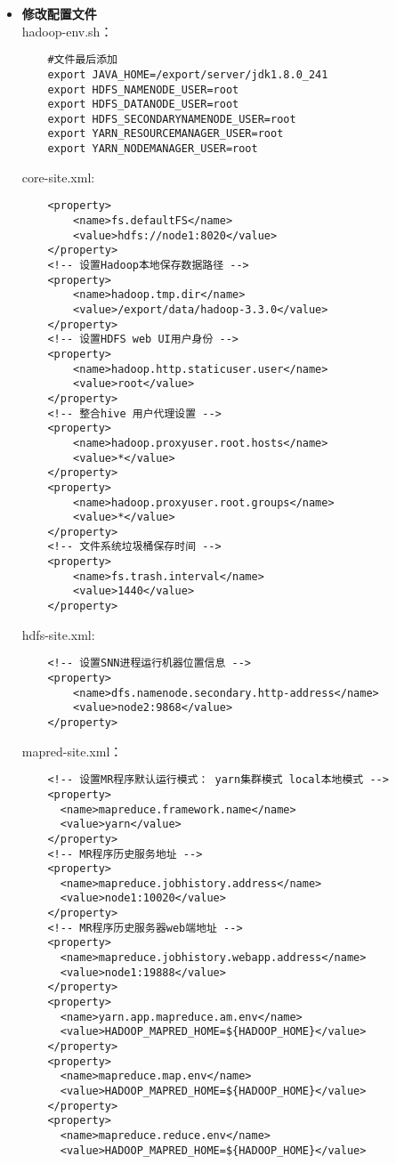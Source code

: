 \documentclass[bachelor]{thesis-uestc}
\begin{document}
\begin{itemize}
\item \textbf{修改配置文件}
\\
hadoop-env.sh：
\begin{verbatim}
    #文件最后添加
    export JAVA_HOME=/export/server/jdk1.8.0_241
    export HDFS_NAMENODE_USER=root
    export HDFS_DATANODE_USER=root
    export HDFS_SECONDARYNAMENODE_USER=root
    export YARN_RESOURCEMANAGER_USER=root
    export YARN_NODEMANAGER_USER=root 
\end{verbatim}
core-site.xml:
\begin{verbatim}
    <property>
        <name>fs.defaultFS</name>
        <value>hdfs://node1:8020</value>
    </property>
    <!-- 设置Hadoop本地保存数据路径 -->
    <property>
        <name>hadoop.tmp.dir</name>
        <value>/export/data/hadoop-3.3.0</value>
    </property>
    <!-- 设置HDFS web UI用户身份 -->
    <property>
        <name>hadoop.http.staticuser.user</name>
        <value>root</value>
    </property>
    <!-- 整合hive 用户代理设置 -->
    <property>
        <name>hadoop.proxyuser.root.hosts</name>
        <value>*</value>
    </property>
    <property>
        <name>hadoop.proxyuser.root.groups</name>
        <value>*</value>
    </property>
    <!-- 文件系统垃圾桶保存时间 -->
    <property>
        <name>fs.trash.interval</name>
        <value>1440</value>
    </property>
\end{verbatim}
hdfs-site.xml:
\begin{verbatim}
    <!-- 设置SNN进程运行机器位置信息 -->
    <property>
        <name>dfs.namenode.secondary.http-address</name>
        <value>node2:9868</value>
    </property>
\end{verbatim}
mapred-site.xml：
\begin{verbatim}
    <!-- 设置MR程序默认运行模式： yarn集群模式 local本地模式 -->
    <property>
      <name>mapreduce.framework.name</name>
      <value>yarn</value>
    </property>
    <!-- MR程序历史服务地址 -->
    <property>
      <name>mapreduce.jobhistory.address</name>
      <value>node1:10020</value>
    </property>
    <!-- MR程序历史服务器web端地址 -->
    <property>
      <name>mapreduce.jobhistory.webapp.address</name>
      <value>node1:19888</value>
    </property>
    <property>
      <name>yarn.app.mapreduce.am.env</name>
      <value>HADOOP_MAPRED_HOME=${HADOOP_HOME}</value>
    </property>
    <property>
      <name>mapreduce.map.env</name>
      <value>HADOOP_MAPRED_HOME=${HADOOP_HOME}</value>
    </property>
    <property>
      <name>mapreduce.reduce.env</name>
      <value>HADOOP_MAPRED_HOME=${HADOOP_HOME}</value>

\end{verbatim}
\end{itemize}
\end{document}
